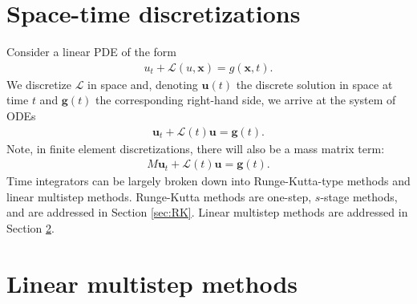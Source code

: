 \documentclass[a4paper,12pt]{article}
\begin{document}
\allowdisplaybreaks


\section{Space-time discretizations}\label{sec:disc}

Consider a linear PDE of the form 
\begin{align*}
u_t + \mathcal{L}(u,\mathbf{x}) = g(\mathbf{x},t).
\end{align*}
We discretize $\mathcal{L}$ in space and, denoting $\mathbf{u}(t)$ the discrete solution in space at time $t$
and $\mathbf{g}(t)$ the corresponding right-hand side, we arrive at the system of ODEs 
%
\begin{align}\label{eq:ode}
\mathbf{u}_t + \mathcal{L}(t)\mathbf{u} = \mathbf{g}(t).
\end{align}
%
Note, in finite element discretizations, there will also be a mass matrix term:
%
\begin{align}\label{eq:odeM}
M\mathbf{u}_t + \mathcal{L}(t)\mathbf{u} = \mathbf{g}(t).
\end{align}
%
Time integrators can be largely broken down into Runge-Kutta-type methods and linear multistep methods. Runge-Kutta methods
are one-step, $s$-stage methods, and are addressed in Section \ref{sec:RK}. Linear multistep methods are addressed in Section
\ref{sec:multi}.

\section{Linear multistep methods}\label{sec:multi}
\end{document}
